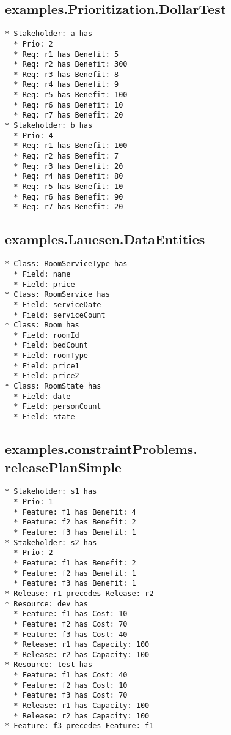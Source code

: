 \documentclass[a4paper,oneside]{article}
\begin{document}
\begin{multicols*}{4}
\begin{lstlisting}
\end{lstlisting}


\subsection*{examples.Prioritization.DollarTest}
\begin{lstlisting}
* Stakeholder: a has
  * Prio: 2
  * Req: r1 has Benefit: 5
  * Req: r2 has Benefit: 300
  * Req: r3 has Benefit: 8
  * Req: r4 has Benefit: 9
  * Req: r5 has Benefit: 100
  * Req: r6 has Benefit: 10
  * Req: r7 has Benefit: 20
* Stakeholder: b has
  * Prio: 4
  * Req: r1 has Benefit: 100
  * Req: r2 has Benefit: 7
  * Req: r3 has Benefit: 20
  * Req: r4 has Benefit: 80
  * Req: r5 has Benefit: 10
  * Req: r6 has Benefit: 90
  * Req: r7 has Benefit: 20

\end{lstlisting}


\vfill\null\columnbreak
\subsection*{examples.Lauesen.DataEntities}
\begin{lstlisting}
* Class: RoomServiceType has
  * Field: name
  * Field: price
* Class: RoomService has
  * Field: serviceDate
  * Field: serviceCount
* Class: Room has
  * Field: roomId
  * Field: bedCount
  * Field: roomType
  * Field: price1
  * Field: price2
* Class: RoomState has
  * Field: date
  * Field: personCount
  * Field: state

\end{lstlisting}

 
\subsection*{examples.constraintProblems.\\releasePlanSimple}
\begin{lstlisting}
* Stakeholder: s1 has
  * Prio: 1
  * Feature: f1 has Benefit: 4
  * Feature: f2 has Benefit: 2
  * Feature: f3 has Benefit: 1
* Stakeholder: s2 has
  * Prio: 2
  * Feature: f1 has Benefit: 2
  * Feature: f2 has Benefit: 1
  * Feature: f3 has Benefit: 1
* Release: r1 precedes Release: r2
* Resource: dev has
  * Feature: f1 has Cost: 10
  * Feature: f2 has Cost: 70
  * Feature: f3 has Cost: 40
  * Release: r1 has Capacity: 100
  * Release: r2 has Capacity: 100
* Resource: test has
  * Feature: f1 has Cost: 40
  * Feature: f2 has Cost: 10
  * Feature: f3 has Cost: 70
  * Release: r1 has Capacity: 100
  * Release: r2 has Capacity: 100
* Feature: f3 precedes Feature: f1

\end{lstlisting}

 
\end{multicols*}
\end{document}
